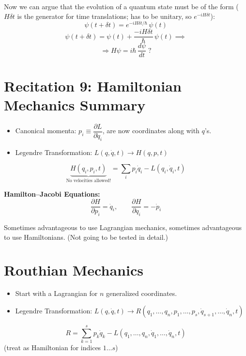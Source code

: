 Now we can argue that the evolution of a quantum state must be of the form ($H\delta t$ is the generator for time translations; has to be unitary, so $e^{-iH\delta t}$):
\[
    \psi(t+\delta t) = e^{-iH\delta t/\hbar}\,\psi(t)
\]
\[
    \psi(t+\delta t) = \psi(t) + \frac{-iH\delta t}{\hbar}\,\psi(t) \implies
\]
\[
    \Rightarrow H\psi = i\hbar\,\frac{d\psi}{dt} \;?
\]


\section*{Recitation 9: Hamiltonian Mechanics Summary}

\begin{itemize}
    \item Canonical momenta: $p_i \equiv \dfrac{\partial L}{\partial \dot{q}_i}$, are now coordinates along with $q$'s.
    \item Legendre Transformation: $L(q,\dot{q},t) \to H(q,p,t)$
\end{itemize}

\[
    \underbrace{H(q_i, p_i, t)}_{\text{No velocities allowed!}} = \sum_i p_i\dot{q}_i - L(q_i, \dot{q}_i, t)
\]

\textbf{Hamilton--Jacobi Equations:}
\[
    \frac{\partial H}{\partial p_i} = \dot{q}_i, \qquad \frac{\partial H}{\partial q_i} = -\dot{p}_i
\]

Sometimes advantageous to use Lagrangian mechanics, sometimes advantageous to use Hamiltonians. (Not going to be tested in detail.)

\section{Routhian Mechanics}

\begin{itemize}
    \item Start with a Lagrangian for $n$ generalized coordinates.
    \item Legendre Transformation: $L(q,\dot{q},t) \to R(q_1,\ldots,q_n,p_1,\ldots,p_s,\dot{q}_{s+1},\ldots,\dot{q}_n,t)$
\end{itemize}

\[
    R = \sum_{k=1}^{s} p_k\dot{q}_k - L(q_{1},\ldots,q_n,\dot{q}_1,\ldots,\dot{q}_n, t)
\]
(treat as Hamiltonian for indices $1\ldots s$)

